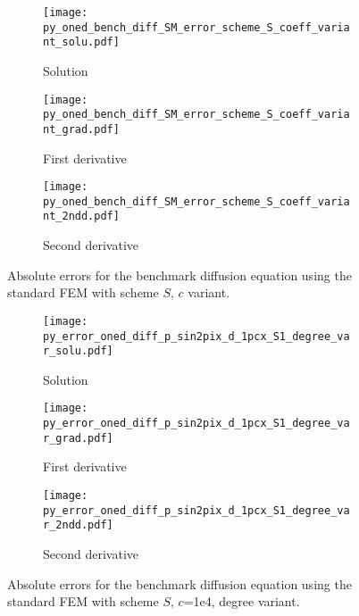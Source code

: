 \documentclass[review,3p]{elsarticle}
\begin{document}
\begin{figure}[!ht]
    \begin{subfigure}{5.5cm}
        \texttt{[image: py\_oned\_bench\_diff\_SM\_error\_scheme\_S\_coeff\_variant\_solu.pdf]}
        \caption{Solution}
        \label{py_oned_bench_diff_SM_error_scheme_S_coeff_variant_solu}
    \end{subfigure}
    \hspace{-0.2cm}
    \begin{subfigure}{5.5cm}
        \texttt{[image: py\_oned\_bench\_diff\_SM\_error\_scheme\_S\_coeff\_variant\_grad.pdf]}
        \caption{First derivative}
        \label{py_oned_bench_diff_SM_error_scheme_S_coeff_variant_grad}
    \end{subfigure}
    \hspace{-0.2cm}
    \begin{subfigure}{5.5cm}
        \texttt{[image: py\_oned\_bench\_diff\_SM\_error\_scheme\_S\_coeff\_variant\_2ndd.pdf]}
        \caption{Second derivative}
        \label{py_oned_bench_diff_SM_error_scheme_S_coeff_variant_2ndd}
    \end{subfigure}
\caption{Absolute errors for the benchmark diffusion equation using the standard FEM with scheme $S$, $c$ variant.}
\label{py_oned_bench_diff_SM_error_scheme_S_coeff_variant}
\end{figure}


\begin{figure}[!ht]
    \begin{subfigure}{5.5cm}
        \texttt{[image: py\_error\_oned\_diff\_p\_sin2pix\_d\_1pcx\_S1\_degree\_var\_solu.pdf]}
        \caption{Solution}
        \label{py_error_oned_diff_p_sin2pix_d_1pcx_S1_degree_var_solu}
    \end{subfigure}
    \hspace{-0.2cm}
    \begin{subfigure}{5.5cm}
        \texttt{[image: py\_error\_oned\_diff\_p\_sin2pix\_d\_1pcx\_S1\_degree\_var\_grad.pdf]}
        \caption{First derivative}
        \label{py_error_oned_diff_p_sin2pix_d_1pcx_S1_degree_var_grad}
    \end{subfigure}
    \hspace{-0.2cm}
    \begin{subfigure}{5.5cm}
        \texttt{[image: py\_error\_oned\_diff\_p\_sin2pix\_d\_1pcx\_S1\_degree\_var\_2ndd.pdf]}
        \caption{Second derivative}
        \label{py_error_oned_diff_p_sin2pix_d_1pcx_S1_degree_var_2ndd}
    \end{subfigure}
\caption{Absolute errors for the benchmark diffusion equation using the standard FEM with scheme $S$, $c$=1e4, degree variant.}
\label{py_error_oned_diff_p_sin2pix_d_1pcx_S1_degree_var}
\end{figure}
\end{document}

